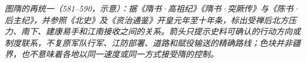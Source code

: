 \begin{center}

\smallskip
\small\textit{图\quad 隋的再统一（581--590，示意）：据《隋书·高祖纪》《隋书·突厥传》与《陈书·后主纪》，并参照《北史》及《资治通鉴》开皇元年至十年条，标出受禅后北方压力、南下、建康易手和江南接收之间的关系。箭头只提示史料可确认的行动方向或制度联系，不复原军队行军、江防部署、道路和赋役输送的精确路线；色块并非疆界，也不意味着各地以同一速度或同一方式接受隋的控制。}
\end{center}
